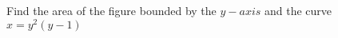
%
%
%
%
% 
% 

\question Find the area of the figure bounded by the $y-axis$ and the curve 
$x=y^2(y-1)$

\insertQR{}

\ifprintanswers
\fi 


